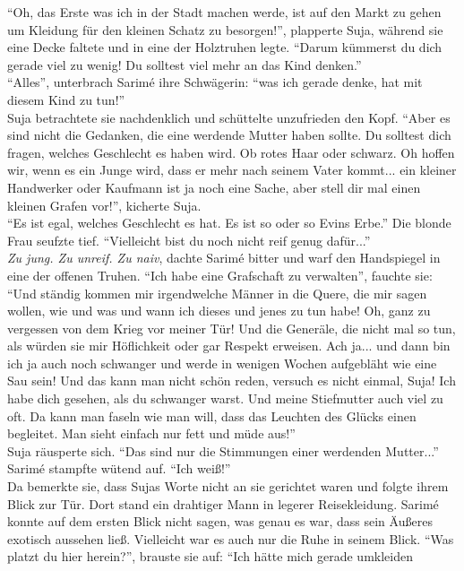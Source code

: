 ``Oh, das Erste was ich in der Stadt machen werde, ist auf den Markt zu gehen um Kleidung für den 
kleinen Schatz zu besorgen!'', plapperte Suja, während sie eine Decke faltete und in eine der 
Holztruhen legte. ``Darum kümmerst du dich gerade viel zu wenig! Du solltest viel mehr an das Kind 
denken.''\\
``Alles'', unterbrach Sarimé ihre Schwägerin: ``was ich gerade denke, hat mit diesem Kind zu 
tun!''\\
Suja betrachtete sie nachdenklich und schüttelte unzufrieden den Kopf. ``Aber es sind nicht die 
Gedanken, die eine werdende Mutter haben sollte. Du solltest dich fragen, welches Geschlecht es 
haben wird. Ob rotes Haar oder schwarz. Oh hoffen wir, wenn es ein Junge wird, dass er mehr nach 
seinem Vater kommt... ein kleiner Handwerker oder Kaufmann ist ja noch eine Sache, aber stell dir 
mal einen kleinen Grafen vor!'', kicherte Suja.\\
``Es ist egal, welches Geschlecht es hat. Es ist so oder so Evins Erbe.''
Die blonde Frau seufzte tief. ``Vielleicht bist du noch nicht reif genug dafür...''\\
\textit{Zu jung. Zu unreif. Zu naiv}, dachte Sarimé bitter und warf den Handspiegel in eine der 
offenen Truhen. ``Ich habe eine Grafschaft zu verwalten'', fauchte sie: ``Und ständig kommen mir 
irgendwelche Männer in die Quere, die mir sagen wollen, wie und was und wann ich dieses und jenes 
zu tun habe! Oh, ganz zu vergessen von dem Krieg vor meiner Tür! Und die Generäle, die nicht 
mal so tun, als würden sie mir Höflichkeit oder gar Respekt erweisen. Ach ja... und dann bin ich ja 
auch noch schwanger und werde in wenigen Wochen aufgebläht wie eine Sau sein! Und das kann man nicht 
schön reden, versuch es nicht einmal, Suja! Ich habe dich gesehen, als du schwanger warst. Und meine 
Stiefmutter auch viel zu oft. Da kann man faseln wie man will, dass das Leuchten des Glücks einen 
begleitet. Man sieht einfach nur fett und müde aus!''\\
Suja räusperte sich. ``Das sind nur die Stimmungen einer werdenden Mutter...''\\
Sarimé stampfte wütend auf. ``Ich weiß!''\\
Da bemerkte sie, dass Sujas Worte nicht an sie gerichtet waren und folgte ihrem Blick zur Tür. Dort 
stand ein drahtiger Mann in legerer Reisekleidung. Sarimé konnte auf dem ersten Blick nicht sagen, 
was genau es war, dass sein Äußeres exotisch aussehen ließ. Vielleicht war es auch nur die Ruhe in 
seinem Blick. ``Was platzt du hier herein?'', brauste sie auf: ``Ich hätte mich gerade umkleiden 
